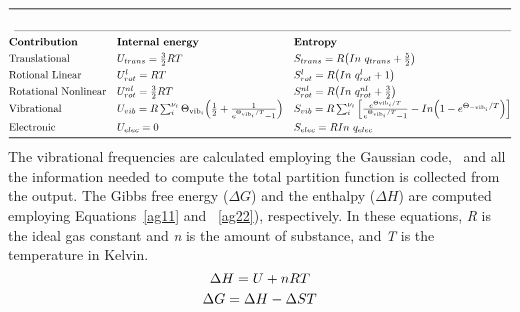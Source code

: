 \documentclass[prb,aps,preprint,showkeys,showpacs]{revtex4}
\begin{document}
\begin{equation}
\label{internal}
\displaystyle
\def\arraystretch{1.3}
\begin{array}{@{}lll@{}}
  \toprule 
  & \multicolumn{2}{c@{}}{}\\
  \cmidrule(l){1-3}
 \text{{\bf{Contribution}}}   & \text{{\bf{Internal energy}}} & \text{{\bf{Entropy}}} \\
\text{Translational}    & U_{trans}=\frac{3}{2}RT  
     &  S_{trans}=R\big(In~q_{trans}+\frac{5}{2}\big)\\
\text{Rotional Linear}    & U^{l}_{rot}=RT   
     &  S^{l}_{rot}=R\big(In~q^{l}_{rot}+1\big) \\
 \text{Rotational Nonlinear}   &   U^{nl}_{rot}=\frac{3}{2}RT   
   &  S^{nl}_{rot}=R\big(In~q^{nl}_{rot}+\frac{3}{2}\big) \\
\text{Vibrational}    & U_{vib}= R\sum_{i}^{\nu_i}\Theta_{{\textup{vib}_i}}\Big(\frac{1}{2}+\frac{1}{e^{\Theta_{{\textup{vib}_i}}/T}-1}\Big)    
     & S_{vib}=R\sum_i^{\nu_i}\Big[ \frac{e^{\Theta{{\textup{vib}_i}}/T}} {{e^{\Theta_{{\textup{vib}_i}}/T}}-1}-In\Big(1-{e^{\Theta_{{-\textup{vib}_i}}/T}}\Big)\Big]\\
\text{Electronic}     & U_{elec}=0    
     & S_{elec}=RIn~q_{elec}\\
\bottomrule
\end{array}
\end{equation}
The vibrational frequencies are calculated employing the Gaussian code,~\cite{gauss} and all the information needed to compute the total partition function is collected from the output.
The Gibbs free energy ($\Delta G$) and the enthalpy ($\Delta H$) are computed employing Equations~\ref{ag11} and ~\ref{ag22}), respectively. In
these equations, \emph{R} is the ideal gas constant and \emph{n} is the amount of substance, and \emph{T} is the
temperature in Kelvin.
\begin{equation}
  \centering
  \displaystyle
   \Delta H=U+nRT\label{ag11}
\end{equation}
\begin{equation}
  \centering 
  \displaystyle
  \Delta G=\Delta H-\Delta ST\label{ag22}
\end{equation}
\end{document}
